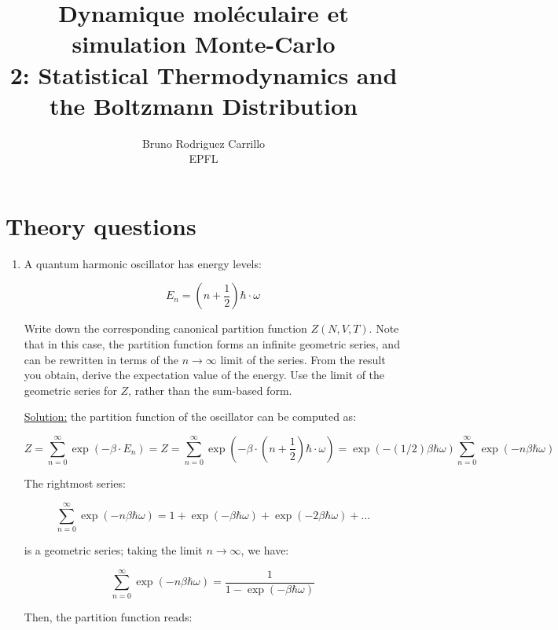 \documentclass[12pt,letterpaper]{report}
\title{ Dynamique moléculaire et simulation Monte-Carlo \\ 2: Statistical Thermodynamics and the Boltzmann Distribution}
\author{Bruno Rodriguez Carrillo \\ EPFL}
\begin{document}
	
	\maketitle
	\section{Theory questions}
	\begin{enumerate}
		\item A quantum harmonic oscillator has energy levels:
		
		\begin{equation}
			E_{n} = 
			\left( 
			n + \dfrac{1}{2} 
			\right)\hbar \cdot \omega
		\end{equation}
		
		Write down the corresponding canonical partition function $Z(N,V,T)$. Note that in this case, the partition function forms an infinite geometric series, and can be rewritten in terms of the $n \rightarrow \infty$ limit of the series. From the result you obtain, derive the expectation value of the energy. Use the limit of
		the geometric series for $Z$, rather than the sum-based form.
		
		\underline{Solution:} the partition function of the oscillator can be computed as: 
		
		\begin{equation*}
			Z = \sum_{n =0 }^{\infty}
			\exp\left( -\beta \cdot E_{n} \right)
			= 
			Z = \sum_{n =0 }^{\infty}
			\exp\left( -\beta \cdot \left( 
			n + \dfrac{1}{2} 
			\right)\hbar \cdot \omega
			\right)
			=
			\exp\left( -(1/2)\beta \hbar \omega\right)\sum_{n =0 }^{\infty}  
			\exp\left(  
			-n\beta \hbar \omega
			\right)
		\end{equation*}
		
		The rightmost series:
		
		$$
		\sum_{n =0 }^{\infty} \exp\left( -n\beta \hbar \omega \right) = 1 + \exp\left( -\beta \hbar \omega \right)  +
		\exp\left( -2\beta \hbar \omega \right) + \ldots
		$$
		
		is a geometric series; taking the limit $n\longrightarrow \infty$, we have:
		
		\begin{equation*}
			\sum_{n =0 }^{\infty}  
			\exp\left(  -n\beta \hbar \omega \right) = \dfrac{1}{ 1- \exp\left( - \beta \hbar \omega \right)   }
		\end{equation*}
		
		Then, the partition function reads: 
		

\end{enumerate}
\end{document}
